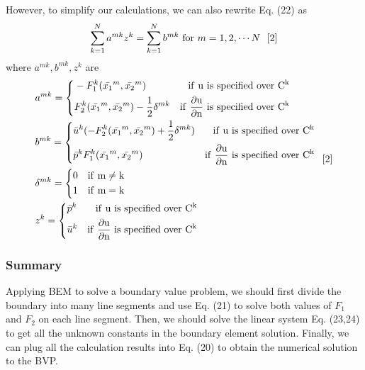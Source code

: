 \documentclass[a4paper,12pt]{article}
\begin{document}
\par However, to simplify our calculations, we can also rewrite Eq. (22) as
\begin{equation}
\sum_{k =1}^{N} a^{mk} z^k = \sum_{k =1}^{N} b^{mk} \  {\rm for } \ m = 1,2,\cdots N \ \ [2]
\end{equation}
where $a^{mk},b^{mk},z^{k}$ are 
\begin{equation}
\begin{aligned}
&a^{mk} = \left\{\begin{aligned} &-F_1^k(\bar{x_1}^m,\bar{x_2}^m) &{\rm if \ u \  is \ specified \ over \ C^k}\\& F_2^k(\bar{x_1}^m,\bar{x_2}^m) - \frac{1}{2} \delta^{mk} &{\rm if \ \frac{\partial u}{\partial n} \  is \ specified \ over \ C^k} \end{aligned}\right.\\
&b^{mk} = \left\{\begin{aligned} &\bar{u}^k(-F_2^k(\bar{x_1}^m,\bar{x_2}^m) + \frac{1}{2}\delta^{mk}) &{\rm if \ u \  is \ specified \ over \ C^k}\\& \bar{p}^kF_1^k(\bar{x_1}^m,\bar{x_2}^m) &{\rm if \ \frac{\partial u}{\partial n} \  is \ specified \ over \ C^k} \end{aligned}\right.\\
&\delta^{mk} = \left\{\begin{aligned} &0 &{\rm if \ m \neq k}\\& 1 &{\rm if \ m = k} \end{aligned}\right.\\
&z^{k} = \left\{\begin{aligned} &\bar{p}^k &{\rm if \ u \  is \ specified \ over \ C^k}\\& \bar{u}^k &{\rm if \ \frac{\partial u}{\partial n} \  is \ specified \ over \ C^k} \end{aligned}\right.\\
\end{aligned} \ \ [2]
\end{equation}
\subsubsection*{Summary}
Applying BEM to solve a boundary value problem, we should first divide the boundary into many line segments and use Eq. (21) to solve both values of $F_1$ and $F_2$ on each line segment. Then, we should solve the linear system Eq. (23,24) to get all the unknown constants in the boundary element solution. Finally, we can plug all the calculation results into Eq. (20) to obtain the numerical solution to the BVP. 
\end{document}
